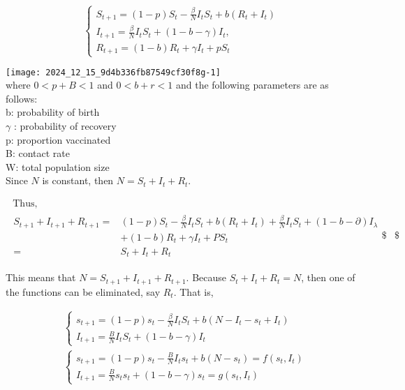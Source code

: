 \documentclass[10pt]{article}
\begin{document}
$$
\left\{\begin{array}{l}
S_{t+1}=(1-p) S_{t}-\frac{\beta}{N} I_{t} S_{t}+b\left(R_{t}+I_{t}\right) \\
I_{t+1}=\frac{\beta}{N} I_{t} S_{t}+(1-b-\gamma) I_{t}, \\
R_{t+1}=(1-b) R_{t}+\gamma I_{t}+p S_{t}
\end{array}\right.
$$

\texttt{[image: 2024\_12\_15\_9d4b336fb87549cf30f8g-1]}\\
where $0<p+B<1$ and $0<b+r<1$ and the following parameters are as follows:\\
b: probability of birth\\
$\gamma$ : probability of recovery\\
p: proportion vaccinated\\
B: contact rate\\
W: total population size\\
Since $N$ is constant, then $N=S_{t}+I_{t}+R_{t}$.

$$
\begin{aligned}
\text { Thus, } \\
\begin{aligned}
S_{t+1}+I_{t+1}+R_{t+1}= & (1-p) S_{t}-\frac{\beta}{N} I_{t} S_{t}+b\left(R_{t}+I_{t}\right)+\frac{\beta}{N} I_{t} S_{t}+(1-b-\partial) I_{\lambda} \\
& +(1-b) R_{t}+\gamma I_{t}+P S_{t} \\
= & S_{t}+I_{t}+R_{t}
\end{aligned} \$ \begin{aligned}
\end{aligned} \$ \begin{aligned}
\end{aligned}
\end{aligned}
$$

This means that $N=S_{t+1}+I_{t+1}+R_{t+1}$. Because $S_{t}+I_{t}+R_{t}=N$, then one of the functions can be eliminated, say $R_{t}$. That is,

$$
\begin{aligned}
& \left\{\begin{array}{l}
s_{t+1}=(1-p) s_{t}-\frac{\beta}{N} I_{t} S_{t}+b\left(N-I_{t}-s_{t}+I_{t}\right) \\
I_{t+1}=\frac{B}{N} I_{t} S_{t}+(1-b-\gamma) I_{t}
\end{array}\right. \\
& \left\{\begin{array}{l}
s_{t+1}=(1-p) s_{t}-\frac{B}{N} I_{t} s_{t}+b\left(N-s_{t}\right)=f\left(s_{t}, I_{t}\right) \\
I_{t+1}=\frac{B}{N} s_{t} s_{t}+(1-b-\gamma) s_{t}=g\left(s_{t}, I_{t}\right)
\end{array}\right.
\end{aligned}
$$
\end{document}
